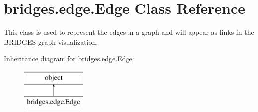 \hypertarget{classbridges_1_1edge_1_1_edge}{}\section{bridges.\+edge.\+Edge Class Reference}
\label{classbridges_1_1edge_1_1_edge}


This class is used to represent the edges in a graph and will appear as links in the B\+R\+I\+D\+G\+ES graph visualization.  


Inheritance diagram for bridges.\+edge.\+Edge\+:\begin{figure}[H]
\begin{center}
\leavevmode
\includegraphics[height=2.000000cm]{classbridges_1_1edge_1_1_edge}
\end{center}
\end{figure}
